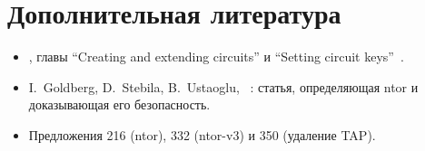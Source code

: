 \section*{Дополнительная литература}
\begin{itemize}
  \item {}, главы \enquote{Creating and extending circuits} и \enquote{Setting circuit keys}~\cite{torspec}.
  \item I.~Goldberg, D.~Stebila, B.~Ustaoglu, ~\cite{goldberg2013ntor}: статья, определяющая ntor и доказывающая его безопасность.
  \item Предложения 216 (ntor), 332 (ntor-v3) и 350 (удаление TAP).
\end{itemize}
